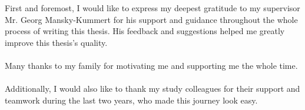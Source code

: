 First and foremost, I would like to express my deepest gratitude to my supervisor Mr. Georg Mansky-Kummert for his support and guidance throughout the whole process of writing this thesis. His feedback and suggestions helped me greatly improve this thesis's quality.\\\\
Many thanks to my family for motivating me and supporting me the whole time.\\\\
Additionally, I would also like to thank my study colleagues for their support and teamwork during the last two years, who made this journey look easy.
